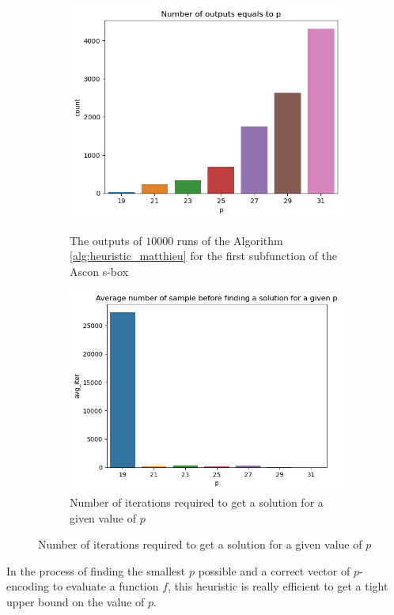\begin{figure}
  \begin{subfigure}{0.48\linewidth}
    \    \centering
    \includegraphics[width=\linewidth]{images/heuristic_ascon_0_p_frequencies.png}
    \caption{The outputs of $10000$ runs of the Algorithm \ref{alg:heuristic_matthieu} for the first subfunction of the Ascon s-box}
    \label{fig:ascon_0_p_frequencies}
  \end{subfigure} \hfill
  \begin{subfigure}{0.48\linewidth}
    \centering
    \includegraphics[width=\linewidth]{images/heuristric_ascon_0_count_iter.png}
    \caption{Number of iterations required to get a solution for a given value of $p$}
    \label{fig:ascon_0_count_iter}
  \end{subfigure}
\end{figure}


In the process of finding the smallest $p$ possible and a correct vector of $p$-encoding to evaluate a function $f$, this heuristic is really efficient to get a tight upper bound on the value of $p$.

